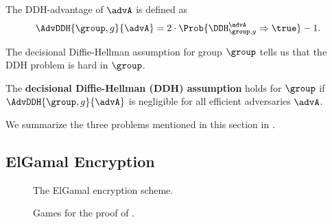 The DDH-advantage of $\advA$ is defined as 
\begin{equation*}
\AdvDDH{\group, g}{\advA} = 2 \cdot \Prob{\DDH_{\group, g}^\advA\Rightarrow\true} - 1.
\end{equation*}

The decisional Diffie-Hellman assumption for group $\group$ tells us that the DDH problem is hard in $\group$. 

\begin{definition}
	The \textbf{decisional Diffie-Hellman (DDH) assumption} holds for $\group$ if $\AdvDDH{\group, g}{\advA}$ is negligible for all efficient adversaries $\advA$.
\end{definition}

We summarize the three problems mentioned in this section in . 

\subsection{ElGamal Encryption}

\begin{figure}
	\center
	\caption{The ElGamal encryption scheme.}
	\label{fig:elgamal}
\end{figure}

\begin{wrapfigure}{r}{1.5in}
	\center
	\caption{Games for the proof of .}
	\label{fig:elgamal-games}
\end{wrapfigure}

